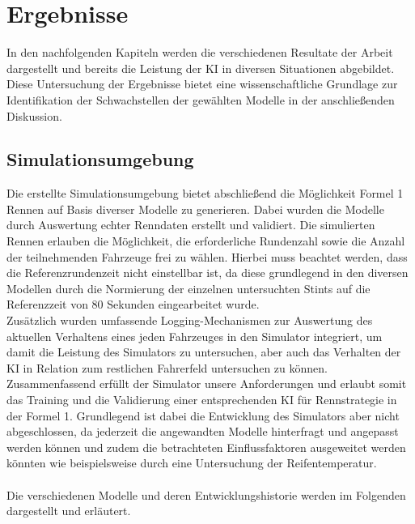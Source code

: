 \section{Ergebnisse}\label{sec:results}
In den nachfolgenden Kapiteln werden die verschiedenen Resultate der Arbeit dargestellt und bereits die Leistung der KI in diversen Situationen abgebildet. Diese Untersuchung der Ergebnisse bietet eine wissenschaftliche Grundlage zur Identifikation der Schwachstellen der gewählten Modelle in der anschließenden Diskussion.

\subsection{Simulationsumgebung}
Die erstellte Simulationsumgebung bietet abschließend die Möglichkeit Formel 1 Rennen auf Basis diverser Modelle zu generieren. Dabei wurden die Modelle durch Auswertung echter Renndaten erstellt und validiert. Die simulierten Rennen erlauben die Möglichkeit, die erforderliche Rundenzahl sowie die Anzahl der teilnehmenden Fahrzeuge frei zu wählen. Hierbei muss beachtet werden, dass die Referenzrundenzeit nicht einstellbar ist, da diese grundlegend in den diversen Modellen durch die Normierung der einzelnen untersuchten Stints auf die Referenzzeit von 80 Sekunden eingearbeitet wurde.
\\
Zusätzlich wurden umfassende Logging-Mechanismen zur Auswertung des aktuellen Verhaltens eines jeden Fahrzeuges in den Simulator integriert, um damit die Leistung des Simulators zu untersuchen, aber auch das Verhalten der KI in Relation zum restlichen Fahrerfeld untersuchen zu können.
\\
Zusammenfassend erfüllt der Simulator unsere Anforderungen und erlaubt somit das Training und die Validierung einer entsprechenden KI für Rennstrategie in der Formel 1. Grundlegend ist dabei die Entwicklung des Simulators aber nicht abgeschlossen, da jederzeit die angewandten Modelle hinterfragt und angepasst werden können und zudem die betrachteten Einflussfaktoren ausgeweitet werden könnten wie beispielsweise durch eine Untersuchung der Reifentemperatur.
\\\\
Die verschiedenen Modelle und deren Entwicklungshistorie werden im Folgenden dargestellt und erläutert. 

